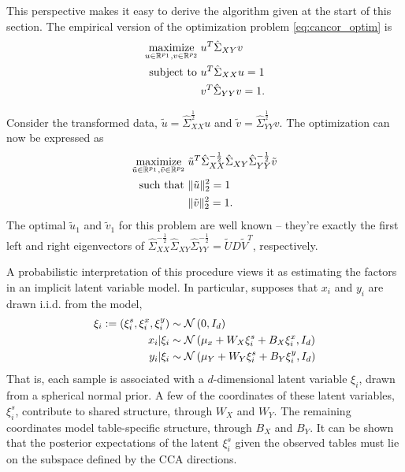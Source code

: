 \documentclass[utf8]{frontiersFPHY} %
\begin{document}
This perspective makes it easy to derive the algorithm given at the start of
this section. The empirical version of the optimization problem
\ref{eq:cancor_optim} is
\begin{align}
  \mathop\mathrm{maximize}_{u \in \mathbb{R}^{p_{1}}, v \in \mathbb{R}^{p_{2}}}\medspace
  &u^{T}\hat{\Sigma}_{XY}v \label{eq:cancor_optim_emp}\\ \text{subject to } &
  u^{T}\hat{\Sigma}_{XX}u = 1 \nonumber \\ & v^{T}\hat{\Sigma}_{YY}v = 1.
  \nonumber
\end{align}

Consider the transformed data, $\tilde{u} = \hat{\Sigma}_{XX}^{\frac{1}{2}}u$
and $\tilde{v} = \hat{\Sigma}_{YY}^{\frac{1}{2}}v$. The
optimization \label{eq:cancor_emp} can now be expressed as
\begin{align}
  \mathop\mathrm{maximize}_{\tilde{u} \in \mathbb{R}^{p_{1}}, \tilde{v} \in
    \mathbb{R}^{p_{2}}}\medspace
  &\tilde{u}^{T}\hat{\Sigma}_{XX}^{-\frac{1}{2}}\hat{\Sigma}_{XY}\hat{\Sigma}_{YY}^{-\frac{1}{2}}\tilde{v} \label{eq:cancor_trans}
  \\ \text{such that } & \|\tilde{u}\|^{2}_{2} = 1 \nonumber
  \\ &\|\tilde{v}\|_{2}^{2} = 1. \nonumber
\end{align}
The optimal $\tilde{u}_1$ and $\tilde{v}_1$ for this problem are well known --
they're exactly the first left and right eigenvectors of
$\hat{\Sigma}_{XX}^{-\frac{1}{2}}\hat{\Sigma}_{XY}\hat{\Sigma}_{YY}^{-\frac{1}{2}}
= \tilde{U}D\tilde{V}^{T}$, respectively.

A probabilistic interpretation of this procedure views it as estimating the
factors in an implicit latent variable model. In particular,
\citep{bach2005probabilistic} supposes that $x_{i}$ and $y_{i}$ are drawn i.i.d.
from the model,
\begin{align*}
  \xi_{i} := \left(\xi_{i}^{s}, \xi_{i}^{x}, \xi_{i}^{y}\right) &\sim
  \mathcal{N}\left(0, I_{d}\right) \\ x_{i} \vert \xi_{i} &\sim \mathcal{N}\left(\mu_{x} +
  W_{X}\xi_{i}^{s} + B_{X}\xi_{i}^{x}, I_{d} \right) \\ y_{i} \vert \xi_{i}
  &\sim \mathcal{N}\left(\mu_{Y} + W_{Y}\xi_{i}^{s} + B_{Y}\xi_{i}^{y}, I_{d}\right)
\end{align*}
That is, each sample is associated with a $d$-dimensional latent variable
$\xi_{i}$, drawn from a spherical normal prior. A few of the coordinates of
these latent variables, $\xi_{i}^{s}$, contribute to shared structure, through
$W_{X}$ and $W_{Y}$. The remaining coordinates model table-specific structure,
through $B_{X}$ and $B_{Y}$. It can be shown that the posterior expectations of
the latent $\xi_{i}^{s}$ given the observed tables must lie on the subspace
defined by the CCA directions.
\end{document}
